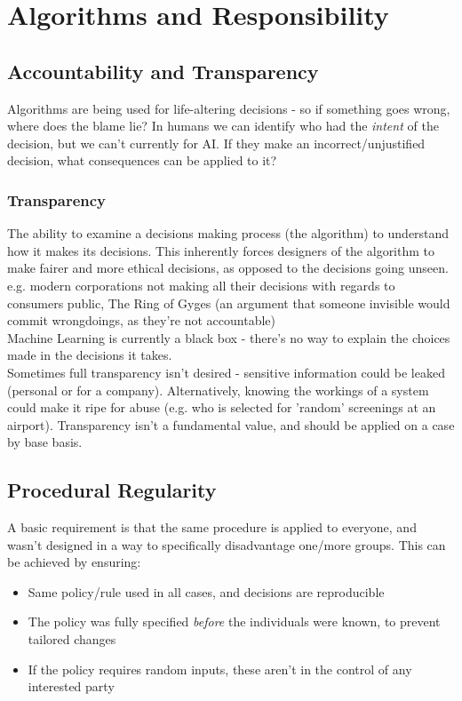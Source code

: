 \section{Algorithms and Responsibility}

\subsection{Accountability and Transparency}
Algorithms are being used for life-altering decisions - so if something goes wrong, where does the blame lie? In humans we can identify who had the \emph{intent} of the decision, but we can't currently for AI. If they make an incorrect/unjustified decision, what consequences can be applied to it?

\subsubsection{Transparency}
The ability to examine a decisions making process (the algorithm) to understand how it makes its decisions. This inherently forces designers of the algorithm to make fairer and more ethical decisions, as opposed to the decisions going unseen. e.g. modern corporations not making all their decisions with regards to consumers public, The Ring of Gyges (an argument that someone invisible would commit wrongdoings, as they're not accountable)\\
Machine Learning is currently a black box - there's no way to explain the choices made in the decisions it takes.\\

Sometimes full transparency isn't desired - sensitive information could be leaked (personal or for a company). Alternatively, knowing the workings of a system could make it ripe for abuse (e.g. who is selected for 'random' screenings at an airport). Transparency isn't a fundamental value, and should be applied on a case by base basis.

\subsection{Procedural Regularity}
A basic requirement is that the same procedure is applied to everyone, and wasn't designed in a way to specifically disadvantage one/more groups. This can be achieved by ensuring:
\begin{itemize}
    \item Same policy/rule used in all cases, and decisions are reproducible
    \item The policy was fully specified \emph{before} the individuals were known, to prevent tailored changes
    \item If the policy requires random inputs, these aren't in the control of any interested party
\end{itemize}

